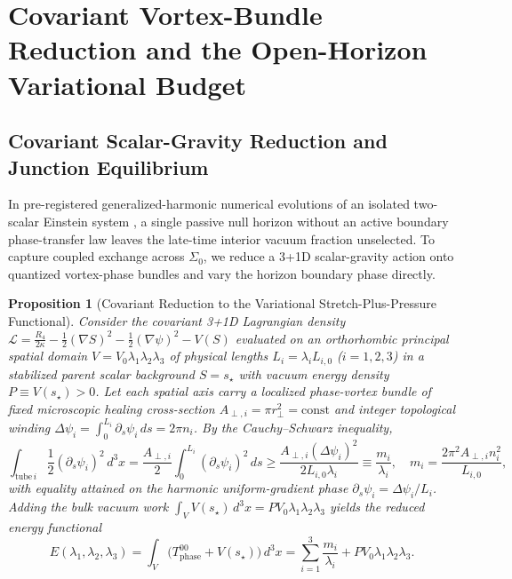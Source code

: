 \documentclass[pdflatex,sn-mathphys-num]{sn-jnl}
\theoremstyle{thmstyleone}
\newtheorem{proposition}[theorem]{Proposition}
\theoremstyle{thmstyletwo}
\theoremstyle{thmstylethree}
\begin{document}
\section{Covariant Vortex-Bundle Reduction and the Open-Horizon Variational Budget}\label{sec:variational}

\subsection{Covariant Scalar-Gravity Reduction and Junction Equilibrium}\label{subsec:reduction}

In pre-registered generalized-harmonic numerical evolutions of an isolated two-scalar Einstein system \cite{Lindblom2006,HebeyVaugon1993,Ek2026Zenodo}, a single passive null horizon without an active boundary phase-transfer law leaves the late-time interior vacuum fraction unselected. To capture coupled exchange across $\Sigma_0$, we reduce a 3+1D scalar-gravity action onto quantized vortex-phase bundles and vary the horizon boundary phase directly.

\begin{proposition}[Covariant Reduction to the Variational Stretch-Plus-Pressure Functional]\label{prop:reduction}
Consider the covariant 3+1D Lagrangian density $\mathcal{L} = \frac{R_4}{2\kappa} - \frac{1}{2}(\nabla S)^2 - \frac{1}{2}(\nabla\psi)^2 - V(S)$ evaluated on an orthorhombic principal spatial domain $V = V_0 \lambda_1 \lambda_2 \lambda_3$ of physical lengths $L_i = \lambda_i L_{i,0}$ ($i=1,2,3$) in a stabilized parent scalar background $S = s_\star$ with vacuum energy density $P \equiv V(s_\star) > 0$. Let each spatial axis carry a localized phase-vortex bundle of fixed microscopic healing cross-section $A_{\perp,i} = \pi r_\perp^2 = \mathrm{const}$ and integer topological winding $\Delta\psi_i = \int_0^{L_i} \partial_s \psi_i\,ds = 2\pi n_i$. By the Cauchy--Schwarz inequality,
\begin{equation}\label{eq:cauchy_schwarz_bundle}
\int_{\mathrm{tube}\,i} \frac{1}{2}(\partial_s \psi_i)^2\,d^3x = \frac{A_{\perp,i}}{2}\int_0^{L_i}(\partial_s\psi_i)^2\,ds \ge \frac{A_{\perp,i}(\Delta\psi_i)^2}{2L_{i,0}\lambda_i} \equiv \frac{m_i}{\lambda_i}, \quad m_i = \frac{2\pi^2 A_{\perp,i} n_i^2}{L_{i,0}},
\end{equation}
with equality attained on the harmonic uniform-gradient phase $\partial_s \psi_i = \Delta\psi_i / L_i$. Adding the bulk vacuum work $\int_V V(s_\star)\,d^3x = PV_0\lambda_1\lambda_2\lambda_3$ yields the reduced energy functional
\begin{equation}\label{eq:a0_functional}
E(\lambda_1,\lambda_2,\lambda_3) = \int_V \big(T_{\mathrm{phase}}^{00} + V(s_\star)\big)\,d^3x = \sum_{i=1}^3 \frac{m_i}{\lambda_i} + PV_0\lambda_1\lambda_2\lambda_3.
\end{equation}
\end{proposition}
\end{document}
